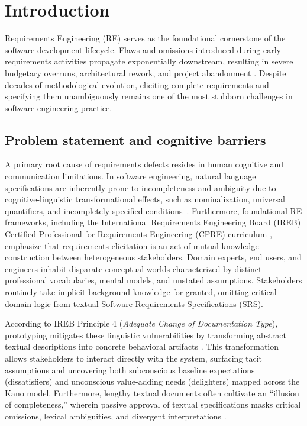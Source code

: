 \documentclass[conference]{IEEEtran}
\begin{document}
\section{Introduction}
\label{sec:introduction}

Requirements Engineering (RE) serves as the foundational cornerstone of the software development lifecycle. Flaws and omissions introduced during early requirements activities propagate exponentially downstream, resulting in severe budgetary overruns, architectural rework, and project abandonment \cite{pohl2016requirements, davis2018maturity}. Despite decades of methodological evolution, eliciting complete requirements and specifying them unambiguously remains one of the most stubborn challenges in software engineering practice.

\subsection{Problem statement and cognitive barriers}
A primary root cause of requirements defects resides in human cognitive and communication limitations. In software engineering, natural language specifications are inherently prone to incompleteness and ambiguity due to cognitive-linguistic transformational effects, such as nominalization, universal quantifiers, and incompletely specified conditions~\cite{pohl2016requirements}. Furthermore, foundational RE frameworks, including the International Requirements Engineering Board (IREB) Certified Professional for Requirements Engineering (CPRE) curriculum \cite{pohl2016requirements}, emphasize that requirements elicitation is an act of mutual knowledge construction between heterogeneous stakeholders. Domain experts, end users, and engineers inhabit disparate conceptual worlds characterized by distinct professional vocabularies, mental models, and unstated assumptions. Stakeholders routinely take implicit background knowledge for granted, omitting critical domain logic from textual Software Requirements Specifications (SRS).

According to IREB Principle 4 (\textit{Adequate Change of Documentation Type}), prototyping mitigates these linguistic vulnerabilities by transforming abstract textual descriptions into concrete behavioral artifacts \cite{pohl2016requirements}. This transformation allows stakeholders to interact directly with the system, surfacing tacit assumptions and uncovering both subconscious baseline expectations (dissatisfiers) and unconscious value-adding needs (delighters) mapped across the Kano model. Furthermore, lengthy textual documents often cultivate an ``illusion of completeness,'' wherein passive approval of textual specifications masks critical omissions, lexical ambiguities, and divergent interpretations \cite{ferrari2016ambiguity, cascon2025ambiguity}.
\end{document}
